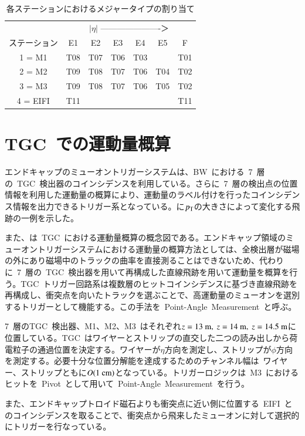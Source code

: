\begin{table}[tb]
	\centering
	\begin{tabular}{c|cccccc}\hline
	& \multicolumn{6}{|c}{$|\eta|$ ----------------------＞} \\
	ステーション & E1 & E2 & E3 & E4 & E5 & F \\ \hline
	1 = M1 & T08 & T07 & T06 & T03 & & T01 \\
	2 = M2 & T09 & T08 & T07 & T06 & T04 & T02 \\
	3 = M3 & T09 & T08 & T07 & T06 & T05 & T02 \\
	4 = EIFI & T11 &&&&& T11 \\ \hline
	\end{tabular}
	\caption{各ステーションにおけるメジャータイプの割り当て}
	\label{tb:4tgc}
\end{table}

\section{TGC~での運動量概算}
エンドキャップのミューオントリガーシステムは、BW~における~7~層の~TGC~検出器のコインシデンスを利用している。さらに~7~層の検出点の位置情報を利用した運動量の概算により、運動量のラベル付けを行ったコインシデンス情報を出力できるトリガー系となっている。に$p_{\rm{T}}$の大きさによって変化する飛跡の一例を示した。

また、は~TGC~における運動量概算の概念図である。エンドキャップ領域のミューオントリガーシステムにおける運動量の概算方法としては、全検出層が磁場の外にあり磁場中のトラックの曲率を直接測ることはできないため、代わりに~7~層の~TGC~検出器を用いて再構成した直線飛跡を用いて運動量を概算を行う。TGC~トリガー回路系は複数層のヒットコインシデンスに基づき直線飛跡を再構成し、衝突点を向いたトラックを選ぶことで、高運動量のミューオンを選別するトリガーとして機能する。この手法を~Point-Angle~Measurement~と呼ぶ。

7~層のTGC~検出器、M1、M2、M3~はそれぞれ$\it{z}=\rm{13}~\rm{m},~\it{z}=\rm{14}~\rm{m},~\it{z}=\rm{14.5}~\rm{m}$に位置している。TGC~はワイヤーとストリップの直交した二つの読み出しから荷電粒子の通過位置を決定する。ワイヤーが$\eta$方向を測定し、ストリップが$\phi$方向を測定する。必要十分な位置分解能を達成するためのチャンネル幅は~ワイヤー、ストリップともに$O(1~\rm{cm})$となっている。トリガーロジックは~M3~におけるヒットを~Pivot~として用いて~Point-Angle~Measurement~を行う。

また、エンドキャップトロイド磁石よりも衝突点に近い側に位置する~EIFI~とのコインシデンスを取ることで、衝突点から飛来したミューオンに対して選択的にトリガーを行なっている。

